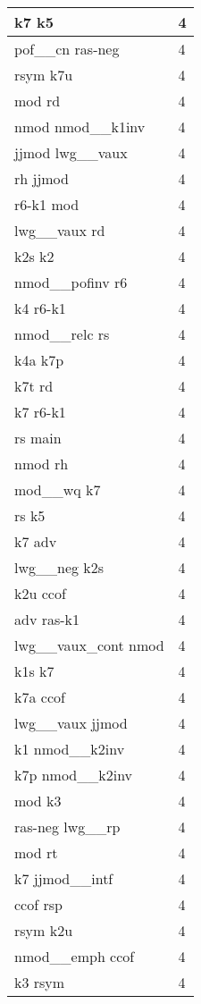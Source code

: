 \documentclass[a4 paper]{article}
\begin{document}
\begin{longtable}{p{}p{}}
k7 k5  & 4 \\ \midrule
pof\_\_cn ras-neg  & 4 \\ \midrule
rsym k7u  & 4 \\ \midrule
mod rd  & 4 \\ \midrule
nmod nmod\_\_k1inv  & 4 \\ \midrule
jjmod lwg\_\_vaux  & 4 \\ \midrule
rh jjmod  & 4 \\ \midrule
r6-k1 mod  & 4 \\ \midrule
lwg\_\_vaux rd  & 4 \\ \midrule
k2s k2  & 4 \\ \midrule
nmod\_\_pofinv r6  & 4 \\ \midrule
k4 r6-k1  & 4 \\ \midrule
nmod\_\_relc rs  & 4 \\ \midrule
k4a k7p  & 4 \\ \midrule
k7t rd  & 4 \\ \midrule
k7 r6-k1  & 4 \\ \midrule
rs main  & 4 \\ \midrule
nmod rh  & 4 \\ \midrule
mod\_\_wq k7  & 4 \\ \midrule
rs k5  & 4 \\ \midrule
k7 adv  & 4 \\ \midrule
lwg\_\_neg k2s  & 4 \\ \midrule
k2u ccof  & 4 \\ \midrule
adv ras-k1  & 4 \\ \midrule
lwg\_\_vaux\_cont nmod  & 4 \\ \midrule
k1s k7  & 4 \\ \midrule
k7a ccof  & 4 \\ \midrule
lwg\_\_vaux jjmod  & 4 \\ \midrule
k1 nmod\_\_k2inv  & 4 \\ \midrule
k7p nmod\_\_k2inv  & 4 \\ \midrule
mod k3  & 4 \\ \midrule
ras-neg lwg\_\_rp  & 4 \\ \midrule
mod rt  & 4 \\ \midrule
k7 jjmod\_\_intf  & 4 \\ \midrule
ccof rsp  & 4 \\ \midrule
rsym k2u  & 4 \\ \midrule
nmod\_\_emph ccof  & 4 \\ \midrule
k3 rsym  & 4 \\ \midrule

\end{longtable}
\end{document}
